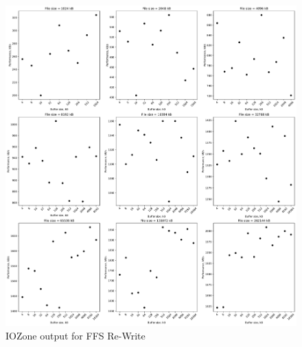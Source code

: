 \begin{figure}[!htb]
	\label{fig:bench_ffs_re_write}
	\begin{center}
		\includegraphics[width=1.0\textwidth]{figures/benchmarking/ffs/Re-Write.pdf}
	\end{center}
	\caption{IOZone output for FFS \mbox{Re-Write}}
\end{figure}

